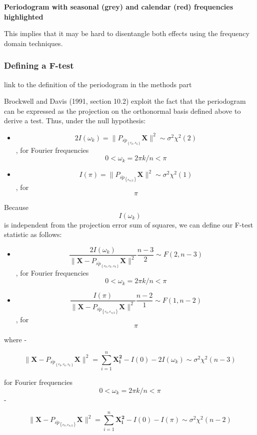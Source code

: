 \documentclass[
  letterpaper,
  DIV=11,
  numbers=noendperiod]{scrreprt}
\providecommand{\tightlist}{%
  \setlength{\itemsep}{0pt}\setlength{\parskip}{0pt}}\usepackage{longtable,booktabs,array}
\begin{document}
\textbf{Periodogram with seasonal (grey) and calendar (red) frequencies
highlighted}

This implies that it may be hard to disentangle both effects using the
frequency domain techniques.

\hypertarget{defining-a-f-test}{%
\subsubsection{Defining a F-test}\label{defining-a-f-test}}

link to the definition of the periodogram in the methods part

Brockwell and Davis (1991, section 10.2) exploit the fact that the
periodogram can be expressed as the projection on the orthonormal basis
defined above to derive a test. Thus, under the null hypothesis:

\begin{itemize}
\tightlist
\item
  \[ 2I(\omega_{k})= \| P_{\bar{sp}_{\left\{ c_{k},s_{k} \right\}}} \mathbf{X} \|^{2}  \sim \sigma^{2} \chi^{2}(2) \],
  for Fourier frequencies \[ 0 < \omega_{k}=2\pi k/n < \pi \]
\item
  \[ I(\pi)= \| P_{\bar{sp}_{\left\{ e_{n/2} \right\}}} \mathbf{X} \|^{2}  \sim \sigma^{2} \chi^{2}(1) \],
  for \[ \pi \]
\end{itemize}

Because \[ I(\omega_{k}) \] is independent from the projection error sum
of squares, we can define our F-test statistic as follows:

\begin{itemize}
\tightlist
\item
  \[ \frac{ 2I(\omega_{k})}{\|\mathbf{X}-P_{\bar{sp}_{\left\{ e_0,c_{k},s_{k} \right\}}} \mathbf{X}\|^2} \frac{n-3}{2} \sim F(2,n-3) \],
  for Fourier frequencies \[ 0 < \omega_{k}=2\pi k/n < \pi \]
\item
  \[ \frac{ I(\pi)}{\|\mathbf{X}-P_{\bar{sp}_{\left\{ e_0,e_{n/2} \right\}}} \mathbf{X}\|^2} \frac{n-2}{1} \sim F(1,n-2)\],
  for \[ \pi \]
\end{itemize}

where -

\[ \|\mathbf{X}-P_{\bar{sp}_{\left\{ e_0,c_{k},s_{k} \right\}}} \mathbf{X}\|^2  = \sum_{i=1}^{n}\mathbf{X^2_i}-I(0)-2I(\omega_{k}) \sim \sigma^{2} \chi^{2}(n-3)\]

for Fourier frequencies \[ 0 < \omega_{k}=2\pi k/n < \pi \] -

\[ \|\mathbf{X}-P_{\bar{sp}_{\left\{ e_0,e_{n/2} \right\}}} \mathbf{X}\|^2 = \sum_{i=1}^{n}\mathbf{X^2_i}-I(0)-I(\pi) \sim \sigma^{2} \chi^{2}(n-2)  \]
\end{document}
